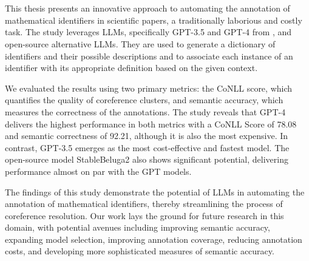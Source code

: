 \chapter{\abstractname}

This thesis presents an innovative approach to automating the annotation of mathematical identifiers in scientific papers, a traditionally laborious and costly task. The study leverages \ac{LLMs}, specifically GPT-3.5 and GPT-4 from \citet{openai2023}, and open-source alternative \ac{LLMs}. They are used to generate a dictionary of identifiers and their possible descriptions and to associate each instance of an identifier with its appropriate definition based on the given context. 

We evaluated the results using two primary metrics: the CoNLL score, which quantifies the quality of coreference clusters, and semantic accuracy, which measures the correctness of the annotations. The study reveals that GPT-4 delivers the highest performance in both metrics with a CoNLL Score of 78.08 and semantic correctness of 92.21, although it is also the most expensive. In contrast, GPT-3.5 emerges as the most cost-effective and fastest model. The open-source model StableBeluga2 also shows significant potential, delivering performance almost on par with the GPT models.

The findings of this study demonstrate the potential of LLMs in automating the annotation of mathematical identifiers, thereby streamlining the process of coreference resolution. Our work lays the ground for future research in this domain, with potential avenues including improving semantic accuracy, expanding model selection, improving annotation coverage, reducing annotation costs, and developing more sophisticated measures of semantic accuracy.
